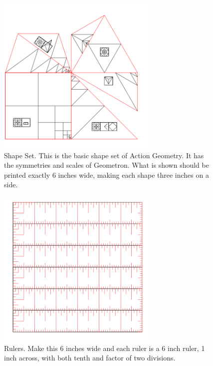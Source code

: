 \begin{figure}
	\centering
	\includegraphics[width=3in]{figures/actiongeometry/shapeset.png}
	\caption[shapeset]
	{Shape Set. This is the basic shape set of Action Geometry.  It has the symmetries and scales of Geometron. What is shown should be printed exactly 6 inches wide, making each shape three inches on a side.}
\end{figure}

\begin{figure}
	\centering
	\includegraphics[width=3in]{figures/actiongeometry/rulers.png}
	\caption[rulers]
	{Rulers.  Make this 6 inches wide and each ruler is a 6 inch ruler, 1 inch across, with both tenth and factor of two divisions.}
\end{figure}

